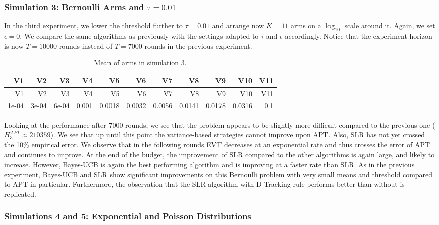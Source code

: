 \documentclass[11pt,]{article}
\begin{document}
\newpage

\subsubsection{\texorpdfstring{Simulation 3: Bernoulli Arms and
\(\tau = 0.01\)}{Simulation 3: Bernoulli Arms and \textbackslash{}tau = 0.01}}\label{simulation-3-bernoulli-arms-and-tau-0.01}

In the third experiment, we lower the threshold further to
\(\tau = 0.01\) and arrange now \(K=11\) arms on a \(\log_{10}\) scale
around it. Again, we set \(\epsilon = 0\). We compare the same
algorithms as previously with the settings adapted to \(\tau\) and
\(\epsilon\) accordingly. Notice that the experiment horizon is now
\(T=10000\) rounds instead of \(T=7000\) rounds in the previous
experiment.

\begin{longtable}[]{@{}rrrrrrrrrrr@{}}
\caption{Mean of arms in simulation 3.}\tabularnewline
\toprule
V1 & V2 & V3 & V4 & V5 & V6 & V7 & V8 & V9 & V10 & V11\tabularnewline
\midrule
\endfirsthead
\toprule
V1 & V2 & V3 & V4 & V5 & V6 & V7 & V8 & V9 & V10 & V11\tabularnewline
\midrule
\endhead
1e-04 & 3e-04 & 6e-04 & 0.001 & 0.0018 & 0.0032 & 0.0056 & 0.0141 &
0.0178 & 0.0316 & 0.1\tabularnewline
\bottomrule
\end{longtable}

Looking at the performance after 7000 rounds, we see that the problem
appears to be slightly more difficult compared to the previous one
(\(H_3^{APT} \approx 210359\)). We see that up until this point the
variance-based strategies cannot improve upon APT. Also, SLR has not yet
crossed the 10\% empirical error. We observe that in the following
rounds EVT decreases at an exponential rate and thus crosses the error
of APT and continues to improve. At the end of the budget, the
improvement of SLR compared to the other algorithms is again large, and
likely to increase. However, Bayes-UCB is again the best performing
algorithm and is improving at a faster rate than SLR. As in the previous
experiment, Bayes-UCB and SLR show significant improvements on this
Bernoulli problem with very small means and threshold compared to APT in
particular. Furthermore, the observation that the SLR algorithm with
D-Tracking rule performs better than without is replicated.

\subsubsection{Simulations 4 and 5: Exponential and Poisson
Distributions}\label{simulations-4-and-5-exponential-and-poisson-distributions}
\end{document}
